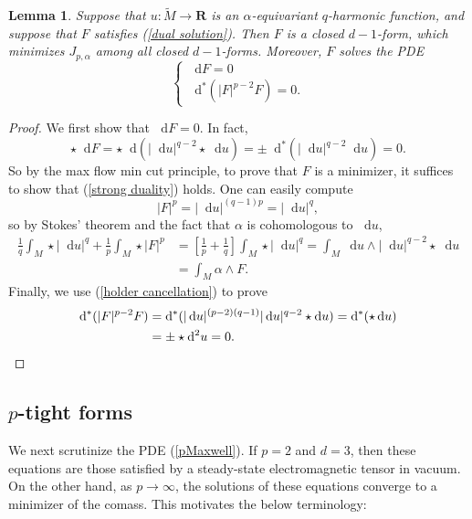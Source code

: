 \documentclass[reqno,11pt]{amsart}
\newcommand{\RR}{\mathbf{R}}
\newcommand*\dif{\mathop{}\!\mathrm{d}}
\newtheorem{lemma}[theorem]{Lemma}
\theoremstyle{definition}
\numberwithin{equation}{section}
\begin{document}
\begin{lemma}
Suppose that $u: \tilde M \to \RR$ is an $\alpha$-equivariant $q$-harmonic function, and suppose that $F$ satisfies (\ref{dual solution}).
Then $F$ is a closed $d - 1$-form, which minimizes $J_{p, \alpha}$ among all closed $d - 1$-forms.
Moreover, $F$ solves the PDE 
\begin{equation}\label{pMaxwell}
\begin{cases}
	\dif F = 0 \\
	\dif^* (|F|^{p - 2} F) = 0.
\end{cases}
\end{equation}
\end{lemma}
\begin{proof}
We first show that $\dif F = 0$.
In fact, 
$$\star \dif F = \star \dif(|\dif u|^{q - 2} \star \dif u) = \pm \dif^*(|\dif u|^{q - 2} \dif u) = 0.$$
So by the max flow min cut principle, to prove that $F$ is a minimizer, it suffices to show that (\ref{strong duality}) holds.
One can easily compute 
$$|F|^p = |\dif u|^{(q - 1)p} = |\dif u|^q,$$
so by Stokes' theorem and the fact that $\alpha$ is cohomologous to $\dif u$,
\begin{align*}
\frac{1}{q} \int_M \star |\dif u|^q + \frac{1}{p} \int_M \star |F|^p&
= \left[\frac{1}{p} + \frac{1}{q}\right] \int_M \star |\dif u|^q
= \int_M \dif u \wedge |\dif u|^{q - 2} \star \dif u \\
&= \int_M \alpha \wedge F.
\end{align*}
Finally, we use (\ref{holder cancellation}) to prove
\begin{align*}
\dif^*(|F|^{p - 2} F) &= \dif^*(|\dif u|^{(p - 2)(q - 1)} |\dif u|^{q - 2} \star \dif u) = \dif^*(\star \dif u) \\
&= \pm \star \dif^2 u = 0. \qedhere 
\end{align*}
\end{proof}


\subsection{\texorpdfstring{$p$-tight forms}{p-tight forms}}
We next scrutinize the PDE (\ref{pMaxwell}).
If $p = 2$ and $d = 3$, then these equations are those satisfied by a steady-state electromagnetic tensor in vacuum.
On the other hand, as $p \to \infty$, the solutions of these equations converge to a minimizer of the comass.
This motivates the below terminology:
\end{document}

